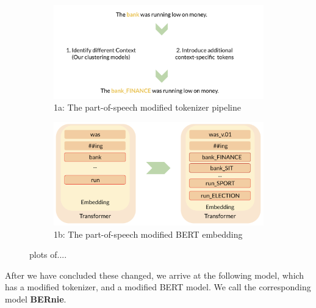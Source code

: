 \documentclass[a4paper,12pt,twoside,openright]{report}
\begin{document}
\begin{figure}[H]
\center
\begin{subfigure}{.5\textwidth}
  \centering
  \includegraphics[width=\linewidth]{./assets/experiments/pipeline_tokenizer_BERnie_meaning.png}
  \caption{1a: The part-of-speech modified tokenizer pipeline}
  \label{fig:sfig1}
\end{subfigure}%
\begin{subfigure}{.55\textwidth}
  \centering
  \includegraphics[width=\linewidth]{./assets/experiments/pipeline_model_BERnie_meaning_embedding.png}
  \caption{1b: The part-of-speech modified BERT embedding}
  \label{fig:sfig2}
\end{subfigure}
\caption{plots of....}
\label{fig:fig}
\end{figure}

After we have concluded these changed, we arrive at the following model, which has a modified tokenizer, and a modified BERT model.
We call the corresponding model \textbf{BERnie}.
\end{document}
